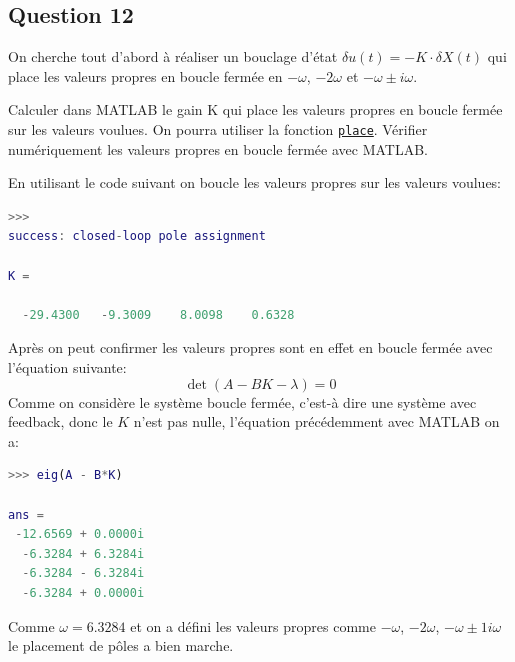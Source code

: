 \documentclass[class=article, crop=false]{standalone}
\begin{document}
\newpage
\subsection{Question 12}
On cherche tout d'abord à réaliser un bouclage d'état $\delta u(t) = - K \cdot \delta X(t)$ qui place les valeurs propres en boucle fermée en $-\omega$, $-2\omega$ et $-\omega \pm i\omega$.
\begin{exercise}
    Calculer dans MATLAB le gain K qui place les valeurs propres en boucle fermée sur les valeurs voulues. On pourra utiliser la fonction \href{https://www.mathworks.com/help/control/ref/place.html}{\texttt{place}}. Vérifier numériquement les valeurs propres en boucle fermée avec MATLAB.
\end{exercise}
\begin{resolution}
    En utilisant le code suivant on boucle les valeurs propres sur les valeurs voulues:
    \begin{scriptsize}\mycode
        
    \end{scriptsize}
    \begin{scriptsize}\mycode
        \begin{lstlisting}[language=Matlab]
>>>
success: closed-loop pole assignment

K =

  -29.4300   -9.3009    8.0098    0.6328
        \end{lstlisting}
    \end{scriptsize}
    Après on peut confirmer les valeurs propres sont en effet en boucle fermée avec l'équation suivante:
    \begin{equation}
        \det (A - B K - \lambda) = 0
    \end{equation}
    Comme on considère le système boucle fermée, c'est-à dire une système avec feedback, donc le $K$ n'est pas nulle, l'équation précédemment avec MATLAB on a:
    \begin{scriptsize}\mycode
        \begin{lstlisting}[language=Matlab]
>>> eig(A - B*K)

ans =
 -12.6569 + 0.0000i
  -6.3284 + 6.3284i
  -6.3284 - 6.3284i
  -6.3284 + 0.0000i
        \end{lstlisting}
    \end{scriptsize}
    Comme $\omega = 6.3284$ et on a défini les valeurs propres comme $-\omega$, $-2\omega$, $-\omega\pm 1 i \omega$ le placement de pôles a bien marche.
\end{resolution}
\end{document}
